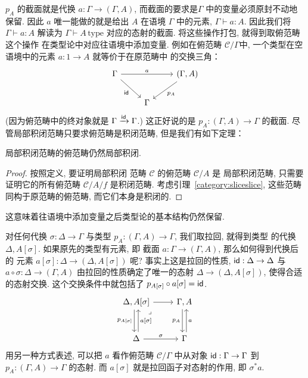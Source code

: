 \(p_A\) 的截面就是代换 \(a : \Gamma \to (\Gamma, A)\),
而截面的要求是\(\Gamma\) 中的变量必须原封不动地保留.
因此 \(a\) 唯一能做的就是给出 \(A\) 在语境 \(\Gamma\)
中的元素, \(\Gamma \vdash a : A\). 因此我们将
\(\Gamma \vdash a : A\) 解读为 \(\Gamma \vdash A\,\text{type}\)
对应的态射的截面. 将这些操作打包, 就得到取俯范畴这个操作
在类型论中对应往语境中添加变量. 例如在俯范畴 \(\mathcal C/\Gamma\)中,
一个类型在空语境中的元素 \(a : 1 \to A\) 就等价于在原范畴中
的交换三角：
\[\begin{tikzcd}
  \Gamma && {(\Gamma, A)} \\
  & \Gamma
  \arrow["{\cons{id}}"', from=1-1, to=2-2]
  \arrow["{p_A}", from=1-3, to=2-2]
  \arrow["a", from=1-1, to=1-3]
\end{tikzcd}\]
(因为俯范畴中的终对象就是 \(\Gamma \xrightarrow{\textsf{id}} \Gamma\).)
这正好说的是 \(p_A : (\Gamma, A) \to \Gamma\) 的截面.
尽管局部积闭范畴只要求俯范畴是积闭范畴, 但是我们有如下定理：
\begin{theorem}
  局部积闭范畴的俯范畴仍然局部积闭.
\end{theorem}
\begin{proof}
按照定义, 要证明局部积闭
范畴 \(\mathcal C\) 的俯范畴 \(\mathcal C/A\) 是
局部积闭范畴, 只需要证明它的所有俯范畴 \(\mathcal C/A/f\)
是积闭范畴. 考虑引理~\ref{category:sliceslice},
这些范畴同构于原范畴的俯范畴, 而它们本身是积闭的.
\end{proof}
这意味着往语境中添加变量之后类型论的基本结构仍然保留.

对任何代换 \(\sigma : \Delta \to \Gamma\) 与类型
\(p_A : (\Gamma, A) \to \Gamma\), 我们取拉回, 就得到类型
的代换 \(\Delta, A[\sigma]\). 如果原先的类型有元素, 即
截面 \(a : \Gamma \to (\Gamma, A)\), 那么如何得到代换后的
元素 \(a[\sigma] : \Delta \to (\Delta, A[\sigma])\) 呢?
事实上这是拉回的性质, \(\textsf{id} : \Delta \to \Delta\)
与 \(a \circ \sigma : \Delta \to (\Gamma, A)\)
由拉回的性质确定了唯一的态射 \(\Delta \to (\Delta, A[\sigma])\),
使得合适的态射交换. 这个交换条件中就包括了
\(p_{A[\sigma]} \circ a[\sigma] = \textsf{id}\).
\[\begin{tikzcd}[row sep=large]
  {\Delta, A[\sigma]} & {\Gamma,A} \\
  \Delta & \Gamma
  \arrow["{p_A}"', shift right=1, from=1-2, to=2-2]
  \arrow["a"', shift right=1, from=2-2, to=1-2]
  \arrow["\sigma", from=2-1, to=2-2]
  \arrow[from=1-1, to=1-2]
  \arrow["{p_{A[\sigma]}}"', shift right=1, from=1-1, to=2-1]
  \arrow["\lrcorner"{anchor=center, pos=0.125}, draw=none, from=1-1, to=2-2]
  \arrow["{a[\sigma]}"', shift right=1, from=2-1, to=1-1]
\end{tikzcd}\]
用另一种方式表述, 可以把 \(a\) 看作俯范畴 \(\mathcal C/\Gamma\)
中从对象 \(\textsf{id} : \Gamma \to \Gamma\) 到
\(p_A : (\Gamma,A) \to \Gamma\) 的态射. 而
\(a[\sigma]\) 就是拉回函子对态射的作用, 即 \(\sigma^* a\).

